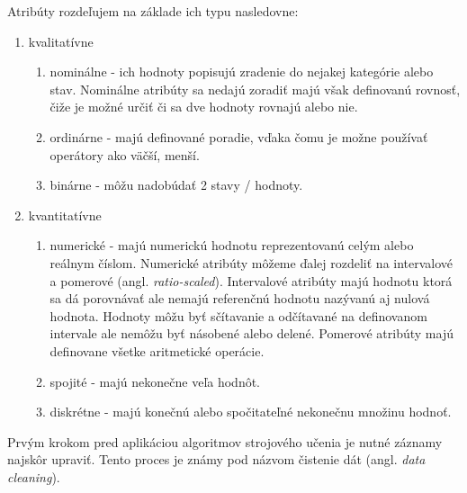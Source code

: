 \documentclass[slovak,master,dept460,male,cpp,cpdeclaration]{diploma}
\begin{document}
Atribúty rozdeľujem na základe ich typu nasledovne:
\begin{enumerate}
\item kvalitatívne
\begin{enumerate}
\item  nominálne -  ich hodnoty popisujú zradenie do nejakej kategórie alebo stav. Nominálne atribúty sa nedajú zoradiť majú však definovanú rovnosť, čiže je možné určiť či sa dve hodnoty rovnajú alebo nie. 
\item ordinárne -  majú definované poradie, vďaka čomu je možne používať operátory ako väčší, menší. 
\item binárne - môžu nadobúdať 2 stavy / hodnoty.
\end{enumerate}
\item kvantitatívne
\begin{enumerate}
\item numerické - majú numerickú hodnotu reprezentovanú celým alebo reálnym číslom.  Numerické atribúty môžeme ďalej rozdeliť na intervalové a pomerové (angl. \textit{ratio-scaled}).  Intervalové atribúty majú hodnotu  ktorá sa dá porovnávať ale nemajú referenčnú hodnotu nazývanú aj nulová hodnota. Hodnoty môžu byť sčítavanie a odčítavané na definovanom intervale ale nemôžu byť násobené alebo delené.  Pomerové atribúty majú definovane všetke aritmetické operácie.
\item  spojité - majú nekonečne veľa hodnôt.
\item diskrétne - majú konečnú alebo spočitateľné nekonečnu množinu hodnoť.
\end{enumerate}
\end{enumerate}

Prvým krokom pred aplikáciou algoritmov strojového učenia je nutné záznamy najskôr upraviť. Tento proces je známy pod názvom čistenie dát (angl. \textit{data cleaning}). 
\end{document}

